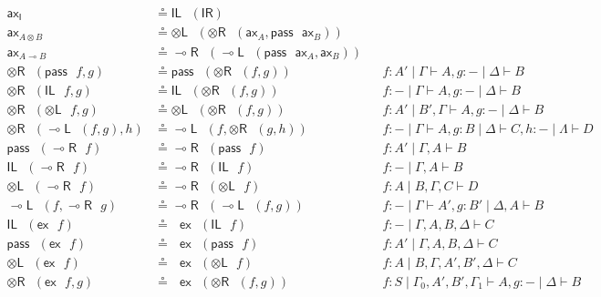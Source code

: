 \documentclass[copyright,creativecommons]{eptcs}
\theoremstyle{definition}
\newcommand{\tl}{\otimes \mathsf{L}}
\newcommand{\tr}{\otimes \mathsf{R}}
\newcommand{\lright}{{\multimap}\mathsf{R}}
\newcommand{\lleft}{{\multimap}\mathsf{L}}
\newcommand{\pass}{\mathsf{pass}}
\newcommand{\unitl}{\mathsf{IL}}
\newcommand{\unitr}{\mathsf{IR}}
\newcommand{\ax}{\mathsf{ax}}
\newcommand{\ot}{\otimes}
\newcommand{\lolli}{\multimap}
\newcommand{\I}{\mathsf{I}}
\newcommand{\ex}{\mathsf{ex}}
\begin{document}
\begin{equation}\label{fig:circeq:sym}
  \begin{array}{rlll}
    \ax_{\I} &\circeq \unitl \text{ } (\unitr)
    \\
    \ax_{A \ot B} &\circeq \tl \text{ } (\tr \text{ } (\ax_{A} , \pass \text{ } \ax_{B}))
    \\
    \ax_{A \lolli B} &\circeq \lright \text{ } (\lleft \text{ } (\pass \text{ } \ax_{A}, \ax_{B} ))
    \\
    \tr \text{ } (\pass \text{ } f, g) &\circeq \pass \text{ } (\tr \text{ } (f, g)) &&f : A' \mid \Gamma \vdash A, g : {-} \mid \Delta \vdash B
    \\
    \tr \text{ } (\unitl \text{ } f, g) &\circeq \unitl \text{ } (\tr \text{ } (f , g)) &&f : {-} \mid \Gamma \vdash A , g : {-} \mid \Delta \vdash B
    \\
    \tr \text{ } (\tl \text{ } f, g) &\circeq \tl \text{ } (\tr \text{ } (f , g)) &&f : A' \mid B' , \Gamma \vdash A , g : {-} \mid \Delta \vdash B
    \\
    \tr \text{ } (\lleft \text{ } (f , g), h) & \circeq \lleft \text{ } (f, \tr \text{ } (g, h)) &&f: {-} \mid \Gamma \vdash A, g : B \mid \Delta \vdash C, h : {-} \mid \Lambda \vdash D
    \\
    \pass \text{ } (\lright \text{ } f) &\circeq \lright \text{ } (\pass \text{ } f) &&f : A' \mid \Gamma , A \vdash B
    \\
    \unitl \text{ } (\lright \text{ } f) &\circeq \lright \text{ } (\unitl \text{ } f) &&f : {-} \mid \Gamma , A \vdash B
    \\
    \tl \text{ } (\lright \text{ } f) &\circeq \lright \text{ } (\tl \text{ } f) &&f : A \mid B , \Gamma , C \vdash D
    \\
    \lleft \text{ } (f, \lright \text{ } g) &\circeq \lright \text{ } (\lleft \text{ } (f, g)) &&f : {-} \mid \Gamma \vdash A', g : B' \mid \Delta , A \vdash B
    \\
    \unitl \text{ } (\ex \text{ } f) &\circeq \text{ } \ex \text{ } (\unitl \text{ } f) &&f: {-} \mid \Gamma , A , B , \Delta \vdash C
    \\
    \pass \text{ } (\ex \text{ } f) &\circeq \text{ } \ex \text{ } (\pass \text{ } f) &&f : A' \mid \Gamma , A , B , \Delta \vdash C
    \\
    \tl \text{ } (\ex \text{ } f) &\circeq \text{ } \ex \text{ } (\tl \text{ } f) &&f : A \mid B , \Gamma , A' , B' , \Delta \vdash C
    \\
    \tr \text{ }(\ex \text{ } f , g) &\circeq \text{ } \ex \text{ } (\tr \text{ } (f , g)) &&f : S \mid \Gamma_0 , A' , B' , \Gamma_1 \vdash A , g : {-} \mid \Delta \vdash B

\end{array}
\end{equation}
\end{document}
